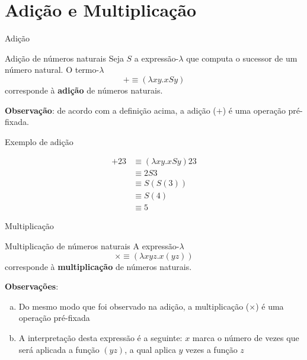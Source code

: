 \section{Adição e Multiplicação}

\begin{frame}[fragile]{Adição}

    \begin{block}{Adição de números naturais}
        Seja $S$ a expressão-$\lambda$ que computa o sucessor de um número natural. O 
        termo-$\lambda$
        \[
            + \equiv (\lambda xy.xSy)
        \]
        corresponde à \textbf{adição} de números naturais.
    \end{block}

    \vspace{0.1in}

    \textbf{Observação}: de acordo com a definição acima, a adição ($+$) é uma operação
    pré-fixada.
\end{frame}

\begin{frame}[fragile]{Exemplo de adição}

    \begin{align*}
        +23 &\equiv (\lambda xy.xSy)23 \\
        &\equiv 2S3 \\
        &\equiv S(S(3)) \\
        &\equiv S(4) \\
        &\equiv 5
    \end{align*}

\end{frame}

\begin{frame}[fragile]{Multiplicação}

    \begin{block}{Multiplicação de números naturais}
        A expressão-$\lambda$
        \[
            \times \equiv (\lambda xyz.x(yz))
        \]
        corresponde à \textbf{multiplicação} de números naturais.
    \end{block}

    \vspace{0.1in}

    \textbf{Observações}:
    \begin{enumerate}[(a)]
        \item Do mesmo modo que foi observado na adição, a multiplicação ($\times$) é uma operação 
            pré-fixada
        \item A interpretação desta expressão é a seguinte: $x$ marca o número de vezes que
            será aplicada a função $(yz)$, a qual aplica $y$ vezes a função $z$
    \end{enumerate}
\end{frame}

